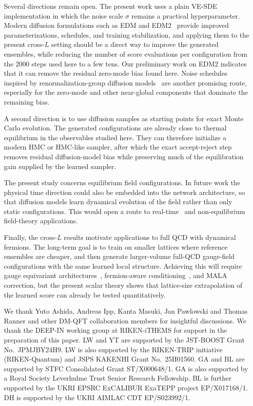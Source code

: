 \documentclass[reprint,twocolumn,superscriptaddress,preprintnumbers,amsmath,amssymb,aps,prd,floatfix]{revtex4-2}
\begin{document}
Several directions remain open. The present work uses a plain VE-SDE implementation in which the noise scale $\sigma$ remains a practical hyperparameter. Modern diffusion formulations such as EDM and EDM2~\cite{Karras2022EDM,Karras2024EDM2} provide improved parameterizations, schedules, and training stabilization, and applying them to the present cross-$L$ setting should be a direct way to improve the generated ensembles, while reducing the number of score evaluations per configuration from the 2000 steps used here to a few tens. Our preliminary work on EDM2 indicates that it can remove the residual zero-mode bias found here. Noise schedules inspired by renormalization-group diffusion models~\cite{Masuki:2025pfx} are another promising route, especially for the zero-mode and other near-global components that dominate the remaining bias.

A second direction is to use diffusion samples as starting points for exact Monte Carlo evolution. The generated configurations are already close to thermal equilibrium in the observables studied here. They can therefore initialize a modern HMC or HMC-like sampler, after which the exact accept-reject step removes residual diffusion-model bias while preserving much of the equilibration gain supplied by the learned sampler.

The present study concerns equilibrium field configurations. In future work the physical time direction could also be embedded into the network architecture, so that diffusion models learn dynamical evolution of the field rather than only static configurations. This would open a route to real-time~\cite{Berges:2006xc,Tan:2021zid,Tan:2024fuq} and non-equilibrium~\cite{Tan:2025bsv} field-theory applications.

Finally, the cross-$L$ results motivate applications to full QCD with dynamical fermions. The long-term goal is to train on smaller lattices where reference ensembles are cheaper, and then generate larger-volume full-QCD gauge-field configurations with the same learned local structure. Achieving this will require gauge equivariant architectures~\cite{Aarts:2026zzr}, fermion-aware conditioning~\cite{Abbott:2022zhs}, and MALA correction, but the present scalar theory shows that lattice-size extrapolation of the learned score can already be tested quantitatively.

\begin{acknowledgments}
We thank Yuto Ashida, Andreas Ipp, Kanta Masuki, Jan Pawlowski and Thomas Ranner and other DM-QFT collaboration members for insightful discussions.
We thank the DEEP-IN working group at RIKEN-iTHEMS for support in the preparation of this paper.
LW and YT are supported by the JST-BOOST Grant No.\ JPMJBY24H9. LW is also supported by the RIKEN-TRIP initiative (RIKEN-Quantum) and JSPS KAKENHI Grant No.\ 25H01560.
GA and BL are supported by STFC Consolidated Grant ST/X000648/1. 
GA is also supported by a Royal Society Leverhulme Trust Senior Research Fellowship.
BL is further supported by the UKRI EPSRC ExCALIBUR ExaTEPP project EP/X017168/1.
DH is supported by the UKRI AIMLAC CDT EP/S023992/1.
\end{acknowledgments}
\end{document}
